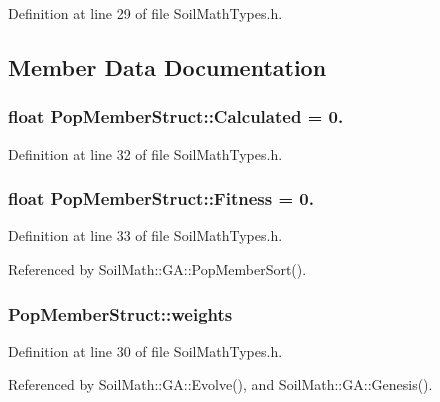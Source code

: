 Definition at line 29 of file Soil\+Math\+Types.\+h.



\subsection{Member Data Documentation}
\hypertarget{struct_pop_member_struct_a8e76eeb476bc89f765b1d872d399fe0c}{}
\subsubsection[{Calculated}]{\setlength{\rightskip}{0pt plus 5cm}float Pop\+Member\+Struct\+::\+Calculated = 0.}\label{struct_pop_member_struct_a8e76eeb476bc89f765b1d872d399fe0c}


Definition at line 32 of file Soil\+Math\+Types.\+h.

\hypertarget{struct_pop_member_struct_a750ec8010731e3e2a876051475c31b14}{}
\subsubsection[{Fitness}]{\setlength{\rightskip}{0pt plus 5cm}float Pop\+Member\+Struct\+::\+Fitness = 0.}\label{struct_pop_member_struct_a750ec8010731e3e2a876051475c31b14}


Definition at line 33 of file Soil\+Math\+Types.\+h.



Referenced by Soil\+Math\+::\+G\+A\+::\+Pop\+Member\+Sort().

\hypertarget{struct_pop_member_struct_aeba960170ef60a906c730cc24cd90367}{}
\subsubsection[{weights}]{ Pop\+Member\+Struct\+::weights}\label{struct_pop_member_struct_aeba960170ef60a906c730cc24cd90367}


Definition at line 30 of file Soil\+Math\+Types.\+h.



Referenced by Soil\+Math\+::\+G\+A\+::\+Evolve(), and Soil\+Math\+::\+G\+A\+::\+Genesis().

